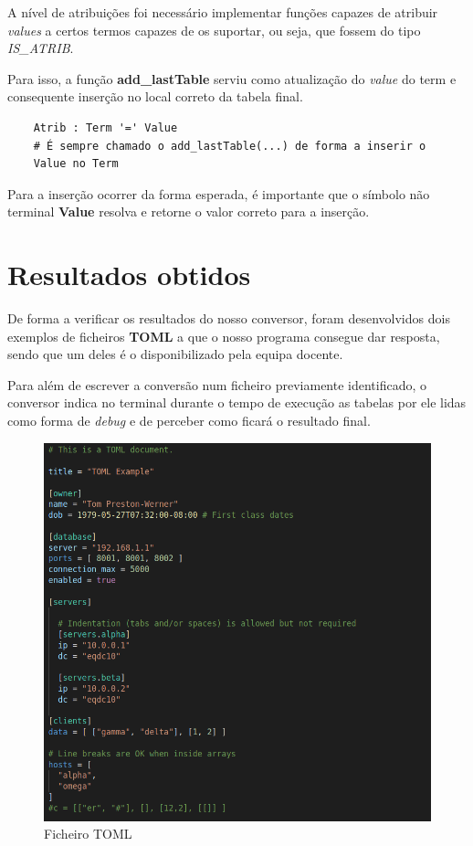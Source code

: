 \documentclass[a4paper,12pt]{report}
\begin{document}
\vspace{5cm}

\par A nível de atribuições foi necessário implementar funções capazes de atribuir \textit{values} a certos termos capazes de os suportar, ou seja, que fossem do tipo \textit{IS\_ATRIB}.
\par Para isso, a função \textbf{add\_lastTable} serviu como atualização do \textit{value} do term e consequente inserção no local correto da tabela final.
\begin{verbatim}
    Atrib : Term '=' Value
    # É sempre chamado o add_lastTable(...) de forma a inserir o
    Value no Term
\end{verbatim}  

\par Para a inserção ocorrer da forma esperada, é importante que o símbolo não terminal \textbf{Value} resolva e retorne o valor correto para a inserção.

\chapter{Resultados obtidos}

De forma a verificar os resultados do nosso conversor, foram desenvolvidos dois exemplos de ficheiros \textbf{TOML} a que o nosso programa consegue dar resposta, sendo que um deles é o disponibilizado pela equipa docente.
\par Para além de escrever a conversão num ficheiro previamente identificado, o conversor indica no terminal durante o tempo de execução as tabelas por ele lidas como forma de \textit{debug} e de perceber como ficará o resultado final.


\begin{figure}[H]
    \centering
    \includegraphics[scale = 0.4]{images/Ficheiro Toml.png}
    \caption{Ficheiro TOML}
    \label{fig:my_label}
\end{figure}
\end{document}
